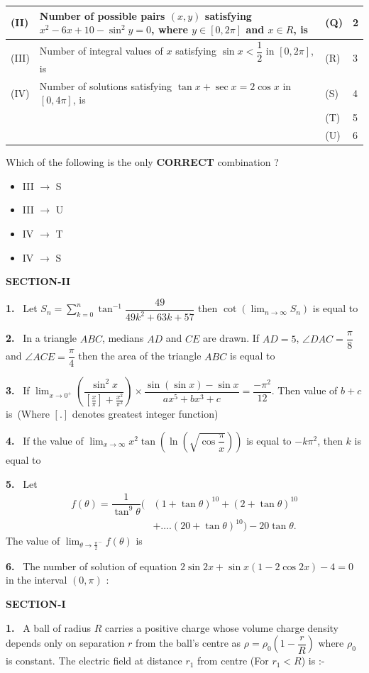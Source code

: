 \documentclass[10pt]{extarticle}
\newcommand{\papersec}[1]{\par\bigskip{\centering\Large\bfseries PAPER-#1\par}\medskip}
\newcommand{\partsec}[2]{\par\medskip\noindent{\large\bfseries PART-#1: #2}\par\smallskip}
\newcommand{\sect}[1]{\par\smallskip\noindent\textbf{#1}\par}
\newcommand{\qn}[1]{\par\smallskip\noindent\textbf{#1.}~}
\newenvironment{qoptions}{\begin{itemize}[leftmargin=1.8em,itemsep=1pt,topsep=2pt,label={}]}{\end{itemize}}
\newcommand{\opt}[2]{\item[(#1)] #2}
\begin{document}
\begin{multicols}{2}
{\begin{center}
\begin{tabular}{|L{0.8cm}|L{4.6cm}|L{0.65cm}|L{0.4cm}|}
\hline
(II) & Number of possible pairs $(x,y)$ satisfying $x^2-6x+10-\sin^2y=0$, where $y\in[0,2\pi]$ and $x\in R$, is & (Q) & 2\\
\hline
(III) & Number of integral values of $x$ satisfying $\sin x<\dfrac12$ in $[0,2\pi]$, is & (R) & 3\\
\hline
(IV) & Number of solutions satisfying $\tan x+\sec x=2\cos x$ in $[0,4\pi]$, is & (S) & 4\\
\hline
{} & (T) & 5\\
\hline
{} & (U) & 6\\
\hline
\end{tabular}\end{center}}
Which of the following is the only \textbf{CORRECT} combination ?
\begin{qoptions}
\opt{A}{III $\to$ S}
\opt{B}{III $\to$ U}
\opt{C}{IV $\to$ T}
\opt{D}{IV $\to$ S}
\end{qoptions}
\sect{SECTION-II}
\qn{1} Let $S_n=\displaystyle\sum_{k=0}^{n}\tan^{-1}\dfrac{49}{49k^2+63k+57}$ then $\cot\left(\displaystyle\lim_{n\to\infty}S_n\right)$ is equal to
\qn{2} In a triangle $ABC$, medians $AD$ and $CE$ are drawn. If $AD=5$, $\angle DAC=\dfrac\pi8$ and $\angle ACE=\dfrac\pi4$ then the area of the triangle $ABC$ is equal to
\qn{3} If $\displaystyle\lim_{x\to0^+}\left(\dfrac{\sin^2x}{\left[\frac x\pi\right]+\frac{x^2}{\pi^2}}\right)\times\dfrac{\sin(\sin x)-\sin x}{ax^5+bx^3+c}=\dfrac{-\pi^2}{12}$. Then value of $b+c$ is\
(Where $[.]$ denotes greatest integer function)
\qn{4} If the value of $\displaystyle\lim_{x\to\infty}x^2\tan\left(\ln\left(\sqrt{\cos\dfrac\pi x}\right)\right)$ is equal to $-k\pi^2$, then $k$ is equal to
\qn{5} Let \[\begin{aligned}f(\theta)=\dfrac1{\tan^9\theta}\Big(&(1+\tan\theta)^{10}+(2+\tan\theta)^{10}\\&+\ldots.(20+\tan\theta)^{10}\Big)-20\tan\theta.\end{aligned}\] The value of $\displaystyle\lim_{\theta\to\frac\pi2^-}f(\theta)$ is
\qn{6} The number of solution of equation $2\sin2x+\sin x(1-2\cos2x)-4=0$ in the interval $(0,\pi)$ :
\raggedcolumns
\newpage
\papersec{2}
\partsec{1}{PHYSICS}
\sect{SECTION-I}
\qn{1} A ball of radius $R$ carries a positive charge whose volume charge density depends only on separation $r$ from the ball's centre as $\rho=\rho_0\left(1-\dfrac rR\right)$ where $\rho_0$ is constant. The electric field at distance $r_1$ from centre (For $r_1<R$) is :-
\begin{qoptions}

\end{qoptions}
\end{multicols}
\end{document}
